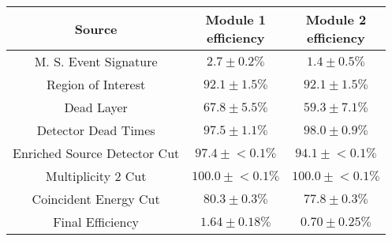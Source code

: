 \begin{tabular}{|c|c|c|}
\hline
  Source & \makecell{Module 1\\efficiency} & \makecell{Module 2\\efficiency} \\
\hline
  M. S. Event Signature & $2.7 \pm 0.2\%$ & $1.4 \pm 0.5\%$ \\
  Region of Interest & $92.1 \pm 1.5\%$ & $92.1 \pm 1.5\%$ \\
  Dead Layer & $67.8 \pm 5.5\%$ & $59.3 \pm 7.1\%$ \\
  Detector Dead Times & $97.5 \pm 1.1\%$ & $98.0 \pm 0.9\%$ \\
  Enriched Source Detector Cut & $97.4 \pm{}<\!0.1\%$ & $94.1 \pm{}<\!0.1\%$ \\
  Multiplicity 2 Cut & $100.0 \pm{}<\!0.1\%$ & $100.0 \pm{}<\!0.1\%$ \\
  Coincident Energy Cut & $80.3 \pm 0.3\%$ & $77.8 \pm 0.3\%$ \\
  \hline Final Efficiency & $1.64 \pm 0.18\%$ & $0.70 \pm 0.25\%$ \\
\hline
\end{tabular}
